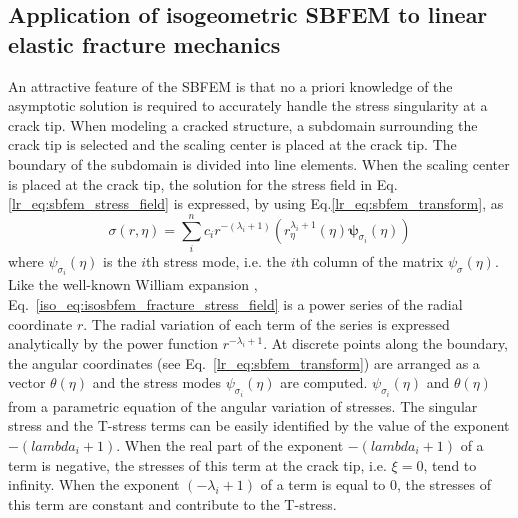 \subsection{Application of isogeometric SBFEM to linear elastic fracture mechanics}
An attractive feature of the SBFEM is that no a priori knowledge of the asymptotic solution is required to accurately handle the stress singularity at a crack tip.
When modeling a cracked structure, a subdomain surrounding the crack tip is selected and the scaling center is placed at the crack tip.
The boundary of the subdomain is divided into line elements.
When the scaling center is placed at the crack tip, the solution for the stress field in Eq.\ref{lr_eq:sbfem_stress_field} is expressed, by using Eq.\ref{lr_eq:sbfem_transform}, as
    \begin{equation}
        \sigma(r,\eta) = \sum_i^n
            c_i r^{-(\lambda_i+1)} \left(
                r_\eta^{\lambda_i+1} (\eta)
                \boldsymbol{\psi}_{\sigma_i}(\eta)
            \right)
        \label{iso_eq:isosbfem_fracture_stress_field}
    \end{equation}
where $\psi_{\sigma_i}(\eta)$ is the $i$th stress mode, i.e. the $i$th column of the matrix $\psi_\sigma(\eta)$.
Like the well-known William expansion \cite{Williams1957109}, Eq.~\ref{iso_eq:isosbfem_fracture_stress_field} is a power series of the radial coordinate $r$.
The radial variation of each term of the series is expressed analytically by the power function $r^{-\lambda_i + 1}$.
At discrete points along the boundary, the angular coordinates (see Eq.~\ref{lr_eq:sbfem_transform}) are arranged as a vector $\theta(\eta)$ and the stress modes $\psi_{\sigma_i}(\eta)$ are computed.
$\psi_{\sigma_i}(\eta)$ and $\theta(\eta)$ from a parametric equation of the angular variation of stresses.
The singular stress and the T-stress terms can be easily identified by the value of the exponent $-(lambda_i+1)$.
When the real part of the exponent $-(lambda_i+1)$ of a term is negative, the stresses of this term at the crack tip, i.e. $\xi=0$, tend to infinity.
When the exponent $(-\lambda_i+1)$ of a term is equal to 0, the stresses of this term are constant and contribute to the T-stress.
